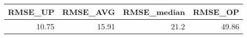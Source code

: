 \begin{tabular}{rrrr}
\toprule
 RMSE\_UP &  RMSE\_AVG &  RMSE\_median &  RMSE\_OP \\
\midrule
   10.75 &     15.91 &         21.2 &    49.86 \\
\bottomrule
\end{tabular}
